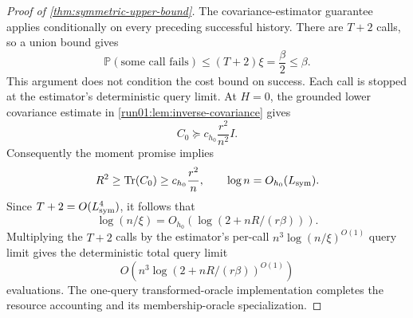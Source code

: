 \documentclass[11pt]{article}
\numberwithin{equation}{section}
\theoremstyle{definition}
\begin{document}
\begin{proof}[Proof of \cref{thm:symmetric-upper-bound}]
The covariance-estimator guarantee applies conditionally on every preceding
successful history.
There are $T+2$ calls, so a union bound gives
\[
\mathbb P(\text{some call fails})
\leq(T+2)\xi
=\frac\beta2
\leq\beta.
\]
This argument does not condition the cost bound on success.
Each call is stopped at the estimator's deterministic query limit.
At $H=0$, the grounded lower covariance estimate in
\cref{run01:lem:inverse-covariance} gives
\[
 C_0\succeq c_{h_0}\frac{r^2}{n^2}I.
\]
Consequently the moment promise implies
\[
R^2
\geq\operatorname{Tr}(C_0)
\geq c_{h_0}\frac{r^2}{n},
\qquad
\log n=O_{h_0}(L_{\rm sym}).
\]
Since $T+2=O(L_{\rm sym}^4)$, it follows that
\[
 \log(n/\xi)
 =O_{h_0}\!\left(\log(2+nR/(r\beta))\right).
\]
Multiplying the $T+2$ calls by the estimator's per-call
$n^3\log(n/\xi)^{O(1)}$ query limit gives the deterministic total query limit
\[
 O\!\left(n^3\log(2+nR/(r\beta))^{O(1)}\right)
\]
evaluations.
The one-query transformed-oracle implementation completes the resource
accounting and its membership-oracle specialization.
\end{proof}
\space
\end{document}
